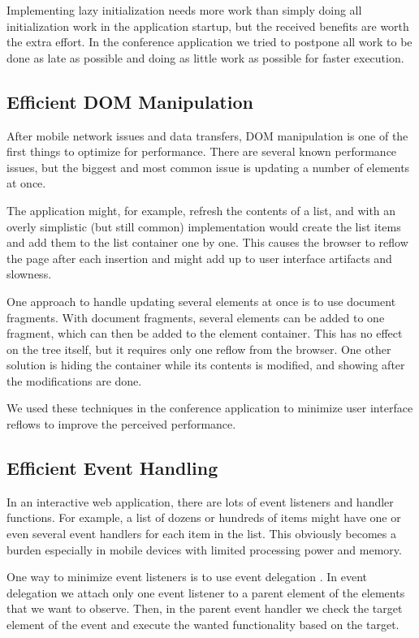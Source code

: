 Implementing lazy initialization needs more work than simply doing all
initialization work in the application startup, but the received
benefits are worth the extra effort. In the conference application we
tried to postpone all work to be done as late as possible and doing as
little work as possible for faster execution.

\subsection{Efficient DOM Manipulation}

After mobile network issues and data transfers, DOM manipulation is
one of the first things to optimize for performance. There are several
known performance issues, but the biggest and most common issue is
updating a number of elements at once. \cite{zakas2010high}

The application might, for example, refresh the contents of a list,
and with an overly simplistic (but still common) implementation would
create the list items and add them to the list container one by
one. This causes the browser to reflow the page after each insertion
and might add up to user interface artifacts and
slowness. \citationneeded

One approach to handle updating several elements at once is to use
document fragments. With document fragments, several elements can be
added to one fragment, which can then be added to the element
container. This has no effect on the  tree itself, but it
requires only one reflow from the browser. One other solution is
hiding the container while its contents is modified, and showing after
the modifications are done. \cite{zakas2010high}

We used these techniques in the conference application to minimize
user interface reflows to improve the perceived performance.

\subsection{Efficient Event Handling}

In an interactive web application, there are lots of event listeners
and handler functions. For example, a list of dozens or hundreds of
items might have one or even several event handlers for each item in
the list. This obviously becomes a burden especially in mobile devices
with limited processing power and memory.

One way to minimize event listeners is to use event delegation
\cite{zakas2010high}. In event delegation we attach only one event
listener to a parent element of the elements that we want to
observe. Then, in the parent event handler we check the target element
of the event and execute the wanted functionality based on the target.

